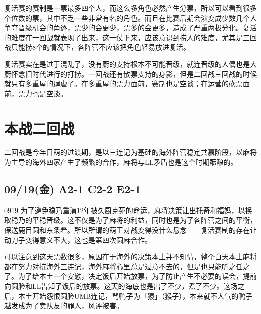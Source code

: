 复活赛的赛制是一票最多四个人，而这么多角色必然产生分票，所以可以看到很多个位数的票，其中不乏一些非常有名的角色。而且在比赛后期会演变成少数几个人争夺晋级机会的角逐，票少的会更少，票多的会更多，造成了严重两极分化。复活的难度在一回战就表现了出来，这一仗下来，应该意识到捞人的难度，尤其是三回战只能捞8个的情况下，各阵营不应该把角色轻易放进复活。

复活赛实在是过于混乱了，没有厨的支持根本不可能晋级，就连晋级的人偶也是大厨怀念旧时代进行的打捞。一回战还有散票支持的身影，但是二回战三回战的时候就只有多重屋的肆虐了。在多重屋的票力面前，赛制也是空谈；在运营的砍票面前，票力也是空谈。

\chapter{本战二回战}

二回战是今年日萌的过渡期，是以三连记为基础的海外阵营稳定共赢阶段，以麻将为主导的海外四家产生了频繁的合作，麻将与LL矛盾也是这个时期酝酿的。

\section{09/19(金) A2-1 C2-2 E2-1}


0919 为了避免稳乃重演12年被久厨克死的命运，麻将决策让出托奇和福妈，以换取稳乃的平稳晋级。这不仅是为了麻将的利益，同时也是为了各阵营之间的平衡，保送鹿目圆和东条希。所以所谓的萌王对战变得没什么悬念——复活赛制的存在让动刀子变得意义不大，这也是第四次圆麻合作。

可以注意到这天票数很多，原因在于海外的决策本土并不知情，整个白天本土麻将都在努力对抗海外三连记，海外麻将心里总是过意不去的，但是也只能听之任之了。为了给本土一个安慰，决定饭后开始放票，为了防止产生不必要的误会，提前向圆脸和LL告知了饭后的放票。这天的海底也是出了不少，煮了不少。这场之后，本土开始怨恨圆脸UMB连记，骂鸭子为「猿」（猴子），本来就不人气的鸭子越发成为了卖队友的罪人，风评被害。

